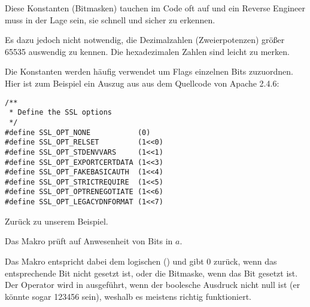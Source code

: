 Diese Konstanten (Bitmasken) tauchen im Code oft auf und ein Reverse Engineer
muss in der Lage sein, sie schnell und sicher zu erkennen.

Es dazu jedoch nicht notwendig, die Dezimalzahlen (Zweierpotenzen) größer
65535 auswendig zu kennen. Die hexadezimalen Zahlen sind leicht zu merken.

Die Konstanten werden häufig verwendet um Flags einzelnen Bits zuzuordnen. 
Hier ist zum Beispiel ein Auszug aus  aus dem Quellcode von
Apache 2.4.6:

\begin{lstlisting}[style=customc]
/**
 * Define the SSL options
 */
#define SSL_OPT_NONE           (0)
#define SSL_OPT_RELSET         (1<<0)
#define SSL_OPT_STDENVVARS     (1<<1)
#define SSL_OPT_EXPORTCERTDATA (1<<3)
#define SSL_OPT_FAKEBASICAUTH  (1<<4)
#define SSL_OPT_STRICTREQUIRE  (1<<5)
#define SSL_OPT_OPTRENEGOTIATE (1<<6)
#define SSL_OPT_LEGACYDNFORMAT (1<<7)
\end{lstlisting}

Zurück zu unserem Beispiel.

Das Makro  prüft auf Anwesenheit von Bits in $a$.

Das Makro  entspricht dabei dem logischen ()
und gibt 0 zurück, wenn das entsprechende Bit nicht gesetzt ist, oder die
Bitmaske, wenn das Bit gesetzt ist.
Der Operator  wird in \CCpp ausgeführt, wenn der boolesche Ausdruck
nicht null ist (er könnte sogar 123456 sein), weshalb es meistens richtig
funktioniert.






